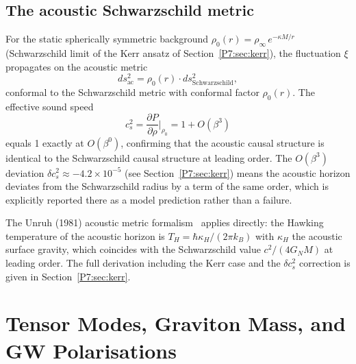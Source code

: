 \documentclass[11pt,a4paper]{article}
\theoremstyle{definition}
\theoremstyle{remark}
\newcommand{\rinfty}{\rho_{\infty}}
\begin{document}
\subsection{The acoustic Schwarzschild metric}
\label{P7:sec:acoustic_schwarz}

For the static spherically symmetric background
$\rho_0(r) = \rinfty\,e^{-\kappa M/r}$ (Schwarzschild limit of the
Kerr ansatz of Section~\ref{P7:sec:kerr}), the fluctuation $\xi$ propagates
on the acoustic metric
\begin{equation}
  ds_{\mathrm{ac}}^2 = \rho_0(r)\cdot ds_{\mathrm{Schwarzschild}}^2,
  \label{P7:eq:acoustic_schwarz}
\end{equation}
conformal to the Schwarzschild metric with conformal factor $\rho_0(r)$.
The effective sound speed
\begin{equation}
  c_s^2 = \frac{\partial P}{\partial\rho}\bigg|_{\rho_0}
        = 1 + O(\beta^3)
  \label{P7:eq:cs_schwarz}
\end{equation}
equals 1 exactly at $O(\beta^0)$, confirming that the acoustic causal
structure is identical to the Schwarzschild causal structure at leading
order.  The $O(\beta^3)$ deviation $\delta c_s^2\approx-4.2\times10^{-5}$
(see Section~\ref{P7:sec:kerr}) means the acoustic horizon deviates from
the Schwarzschild radius by a term of the same order, which is
explicitly reported there as a model prediction rather than a failure.

The Unruh (1981) acoustic metric formalism~\cite{Unruh1981} applies
directly: the Hawking temperature of the acoustic horizon is
$T_H = \hbar\kappa_H/(2\pi k_B)$ with $\kappa_H$ the acoustic surface
gravity, which coincides with the Schwarzschild value $c^2/(4G_NM)$
at leading order.  The full derivation including the Kerr case and the
$\delta c_s^2$ correction is given in Section~\ref{P7:sec:kerr}.

\section{Tensor Modes, Graviton Mass, and GW Polarisations}
\label{P7:sec:tensor}
\end{document}
